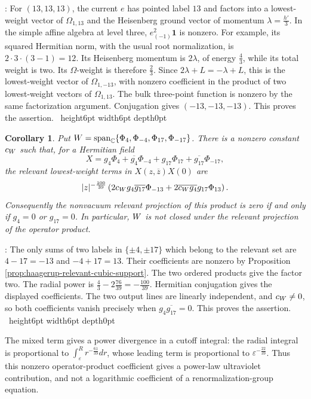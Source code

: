 \documentclass[leqno]{article}
\newcommand{\Cbb}{\ensuremath{\mathbb{C}}}
\let\cal\relax
\newcommand{\cal}{\mathcal}
\newcommand{\qed}{\hfill \vrule height6pt  width6pt depth0pt}
\newcommand{\epsi}{\varepsilon}
\newtheorem{cor}[thm]{Corollary}
\newenvironment{proof}[1][]{\noindent {\it Proof #1} : }{\hbox{~}\qed
\smallskip
}
\numberwithin{equation}{section}
\begin{document}
\begin{proof}
For $(13,13,13)$, the current $e$ has pointed label $13$ and factors into a lowest-weight vector of $\Omega_{1,13}$ and the Heisenberg ground vector of momentum $\lambda = \frac{h'}{3}$. In the simple affine algebra at level three, $e_{(-1)}^2\mathbf1$ is nonzero. For example, its squared Hermitian norm, with the usual root normalization, is $2 \cdot 3 \cdot (3-1) = 12$. Its Heisenberg momentum is $2\lambda$, of energy $\frac43$, while its total weight is two. Its $\Omega$-weight is therefore $\frac23$. Since $2\lambda+L = -\lambda+L$, this is the lowest-weight vector of $\Omega_{1,-13}$, with nonzero coefficient in the product of two lowest-weight vectors of $\Omega_{1,13}$. The bulk three-point function is nonzero by the same factorization argument. Conjugation gives $(-13,-13,-13)$. This proves the assertion.
\end{proof}

\begin{cor}
\label{cor:weak-fields-quadratic-closure}
Put $\cal W = \operatorname{span}_{\Cbb}\{\Phi_4,\Phi_{-4},\Phi_{17},\Phi_{-17}\}$. There is a nonzero constant $c_{\cal W}$ such that, for a Hermitian field
\[
X = g_4\Phi_4+\overline{g_4}\Phi_{-4}+g_{17}\Phi_{17}+\overline{g_{17}}\Phi_{-17},
\]
the relevant lowest-weight terms in $X(z,\overline z)X(0)$ are
\[
|z|^{-\frac{100}{39}}\left(2c_{\cal W}g_4\overline{g_{17}}\Phi_{-13}
+2\overline{c_{\cal W}}\overline{g_4}g_{17}\Phi_{13}\right).
\]
Consequently the nonvacuum relevant projection of this product is zero if and only if $g_4 = 0$ or $g_{17} = 0$. In particular, $\cal W$ is not closed under the relevant projection of the operator product.
\end{cor}

\begin{proof}
The only sums of two labels in $\{\pm4,\pm17\}$ which belong to the relevant set are $4-17 = -13$ and $-4+17 = 13$. Their coefficients are nonzero by Proposition \ref{prop:haagerup-relevant-cubic-support}. The two ordered products give the factor two. The radial power is $\frac43-2\frac{76}{39} = -\frac{100}{39}$. Hermitian conjugation gives the displayed coefficients. The two output lines are linearly independent, and $c_{\cal W} \neq 0$, so both coefficients vanish precisely when $g_4\overline{g_{17}} = 0$. This proves the assertion.
\end{proof}

The mixed term gives a power divergence in a cutoff integral: the radial integral is proportional to $\int_\epsi^R r^{-\frac{61}{39}} dr$, whose leading term is proportional to $\epsi^{-\frac{22}{39}}$. Thus this nonzero operator-product coefficient gives a power-law ultraviolet contribution, and not a logarithmic coefficient of a renormalization-group equation.
\end{document}
